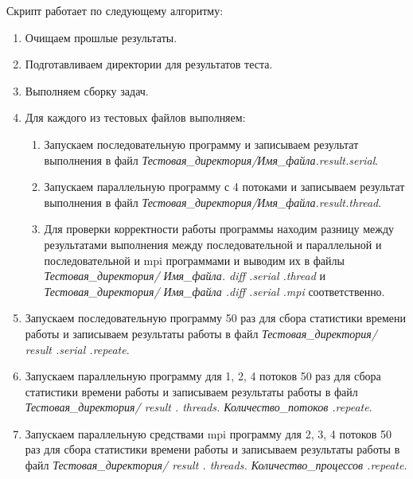 \documentclass[12pt,a4paper]{report}
\begin{document}
				Скрипт работает по следующему алгоритму:
				\begin{enumerate}
					\item Очищаем прошлые результаты.
					\item Подготавливаем директории для результатов теста.
					\item Выполняем сборку задач.
					\item Для каждого из тестовых файлов выполняем:
						\begin{enumerate}
							\item Запускаем последовательную программу и записываем результат выполнения в файл \textit{Тестовая\_директория/Имя\_файла.result.serial}.
							\item Запускаем параллельную программу с 4 потоками и записываем результат выполнения в файл \textit{Тестовая\_директория/Имя\_файла.result.thread}.
							\item Для проверки корректности работы программы находим разницу между результатами выполнения между последовательной и параллельной и последовательной и mpi программами и выводим их в файлы \textit{Тестовая\_директория/ Имя\_файла. diff .serial .thread} и \textit{Тестовая\_директория/ Имя\_файла .diff .serial .mpi} соответственно.
						\end{enumerate}
					\item Запускаем последовательную программу 50 раз для сбора статистики времени работы и записываем результаты работы в файл \textit{Тестовая\_директория/ result .serial .repeate}.
					\item Запускаем параллельную программу для 1, 2, 4 потоков 50 раз для сбора статистики времени работы и записываем результаты работы в файл \textit{Тестовая\_директория/ result . threads. Количество\_потоков .repeate}.
					\item Запускаем параллельную средствами mpi программу для 2, 3, 4 потоков 50 раз для сбора статистики времени работы и записываем результаты работы в файл \textit{Тестовая\_директория/ result . threads. Количество\_процессов .repeate}.
				\end{enumerate}
\end{document}
